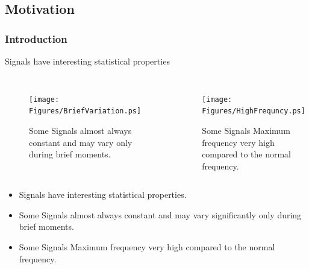 \subsection*{Motivation}
\begin{frame}
	\frametitle{Introduction}
	\begin{center}
		Signals have interesting statistical properties	
	\end{center}
	\begin{center}
		\begin{columns}[c]
		\column{2.5in}
			\begin{figure}
				\begin{center}
					\texttt{[image: Figures/BriefVariation.ps]}\\
               				\caption{Some Signals almost always constant and may vary only during brief moments.}
				\end{center}
			\end{figure}
		\column{2.5in}
			\begin{figure}
				\begin{center}
					\texttt{[image: Figures/HighFrequncy.ps]}\\
               				\caption{Some Signals Maximum frequency very high compared to the normal frequency.}
				\end{center}
			\end{figure}
		\end{columns}
	\end{center}
\end{frame}










		\begin{itemize}
		\item{Signals have interesting statistical properties.}\\
		\item{Some Signals almost always constant and may vary significantly only during brief moments.}\\
		\item{Some Signals Maximum frequency very high compared to the normal frequency.}
 		\end{itemize}


